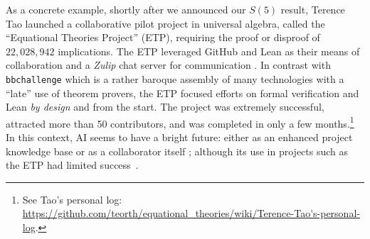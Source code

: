 \documentclass[a4paper,british]{article}
\theoremstyle{definition} %
\numberwithin{equation}{section}
\theoremstyle{definition} %
\newcommand{\CoqBB}{Coq-BB5\xspace}
\begin{document}
As a concrete example, shortly after we announced our $S(5)$ result, Terence Tao launched a collaborative pilot project in universal algebra, called the ``Equational Theories Project'' (ETP), requiring the proof or disproof of $22{,}028{,}942$ implications. The ETP leveraged GitHub and Lean as their means of collaboration and a \textit{Zulip} chat server for communication \cite{TaoBlog, swh-dir-426b52b, ETPpaper}. In contrast with \texttt{bbchallenge} which is a rather baroque assembly of many technologies with a ``late'' use of theorem provers, the ETP focused efforts on formal verification and Lean \textit{by design} and from the start. The project was extremely successful, attracted more than 50 contributors, and was completed in only a few months.\footnote{See Tao's personal log: \url{https://github.com/teorth/equational_theories/wiki/Terence-Tao's-personal-log}.} In this context, AI seems to have a bright future: either as an enhanced project knowledge base or as a collaborator itself \cite{Trinh2024, wu2024internlm25stepproveradvancingautomatedtheorem}; although its use in projects such as the ETP had limited success~\cite{ETPpaper}.





\end{document}
